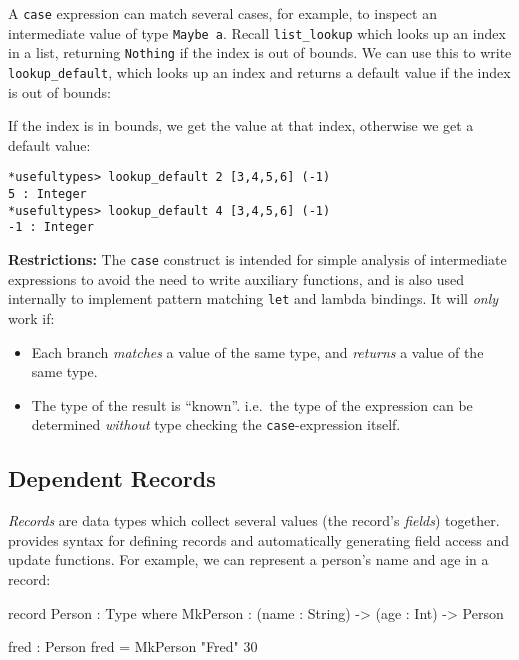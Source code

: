 A \texttt{case} expression can match several cases, for example, to inspect an intermediate value of type \texttt{Maybe a}.
Recall \texttt{list\_lookup} which looks up an index in a list, returning \texttt{Nothing} if the index is out
of bounds.
We can use this to write \texttt{lookup\_default}, which looks up an index and returns a default value if the index is out of bounds:


\noindent
If the index is in bounds, we get the value at that index, otherwise we get a default value:

\begin{lstlisting}[style=stdout]
*usefultypes> lookup_default 2 [3,4,5,6] (-1)
5 : Integer
*usefultypes> lookup_default 4 [3,4,5,6] (-1)
-1 : Integer
\end{lstlisting}


\noindent
\textbf{Restrictions:} The \texttt{case} construct is intended for simple analysis of intermediate expressions to avoid the need to write auxiliary functions, and is also used internally to implement pattern matching \texttt{let} and lambda bindings.
It will \emph{only} work if:

\begin{itemize}
\item Each branch \emph{matches} a value of the same type, and \emph{returns} a value of the same type.
\item The type of the result is ``known''. i.e.\ the type of the expression can be determined \emph{without} type checking the \texttt{case}-expression itself.
\end{itemize}

\subsection{Dependent Records}

\emph{Records} are data types which collect several values (the record's \emph{fields}) together.
\Idris{} provides syntax for defining records and automatically generating field access and update functions.
For example, we can represent a person's name and age in a record:

\begin{code}
record Person : Type where
    MkPerson : (name : String) ->
               (age : Int) -> Person

fred : Person
fred = MkPerson "Fred" 30
\end{code}



